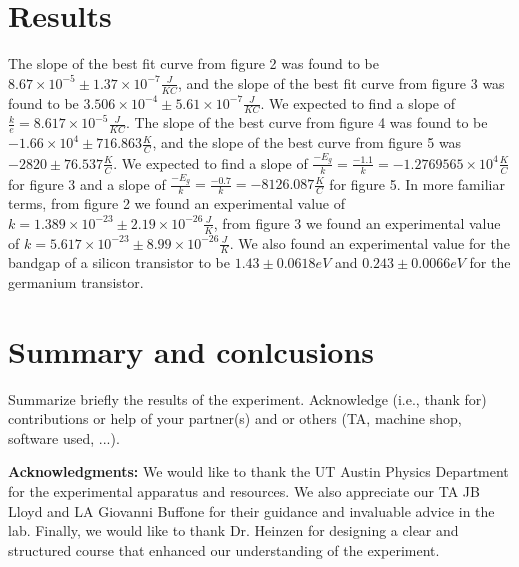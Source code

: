 \documentclass[12pt,letterpaper,twocolumn]{article}
\begin{document}
\section{Results}
The slope of the best fit curve from figure 2 was found to be $8.67 \times 10^{-5} \pm 1.37 \times 10^{-7} \frac{J}{KC}$, and the slope of the best fit curve from figure 3 was found to be $3.506 \times 10^{-4} \pm 5.61\times 10^{-7}\frac{J}{KC}$. We expected to find a slope of $\frac{k}{e} = 8.617 \times 10^{-5}\frac{J}{KC}$. The slope of the best curve from figure 4 was found to be $-1.66 \times 10^{4} \pm 716.863 \frac{K}{C}$, and the slope of the best curve from figure 5 was $-2820 \pm 76.537 \frac{K}{C}$. We expected to find a slope of $\frac{-E_g}{k} = \frac{-1.1}{k} = -1.2769565 \times 10^{4} \frac{K}{C}$ for figure 3 and a slope of $\frac{-E_g}{k} = \frac{-0.7}{k} = -8126.087 \frac{K}{C}$ for figure 5.
In more familiar terms, from figure 2 we found an experimental value of $k = 1.389 \times 10^{-23} \pm 2.19 \times 10^{-26} \frac{J}{K}$, from figure 3 we found an experimental value of $k = 5.617\times 10^{-23} \pm 8.99 \times 10^{-26}\frac{J}{K}$. We also found an experimental value for the bandgap of a silicon transistor to be $1.43 \pm 0.0618 eV$ and $0.243 \pm 0.0066 eV$ for the germanium transistor.


\section{Summary and conlcusions}

Summarize briefly the results of the experiment.
Acknowledge (i.e., thank for) contributions or help
of your partner(s) and or
others (TA, machine shop, software used, ...).

\textbf{Acknowledgments:} We would like to thank the UT Austin Physics Department for the experimental apparatus and resources. We also appreciate our TA JB Lloyd and LA Giovanni Buffone for their guidance and invaluable advice in the lab. Finally, we would like to thank Dr. Heinzen for designing a clear and structured course that enhanced our understanding of the experiment.

\end{document}

